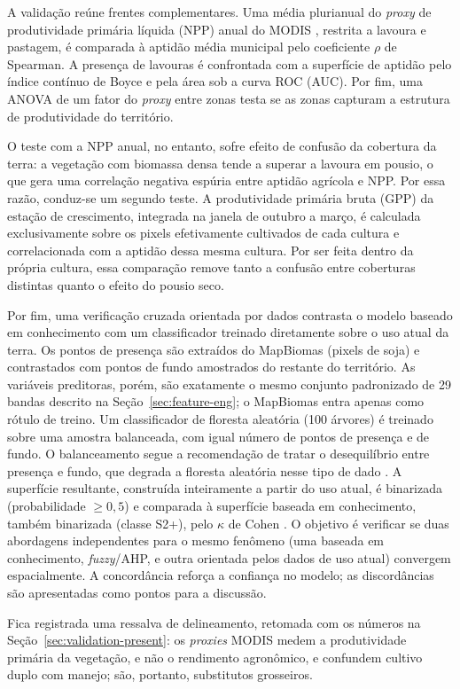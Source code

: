 A validação reúne frentes complementares. Uma média plurianual do \emph{proxy} de produtividade
primária líquida (NPP) anual do MODIS \citep{zhao_improvements_2005}, restrita a lavoura e pastagem, é
comparada à aptidão média municipal pelo coeficiente $\rho$ de Spearman. A presença de lavouras é
confrontada com a superfície de aptidão pelo índice contínuo de Boyce \citep{hirzel_evaluating_2006} e
pela área sob a curva ROC (AUC). Por fim, uma ANOVA de um fator do \emph{proxy} entre zonas testa se
as zonas capturam a estrutura de produtividade do território.

O teste com a NPP anual, no entanto, sofre efeito de confusão da cobertura da terra: a vegetação com
biomassa densa tende a superar a lavoura em pousio, o que gera uma correlação negativa espúria entre
aptidão agrícola e NPP. Por essa razão, conduz-se um segundo teste. A produtividade primária bruta
(GPP) da estação de crescimento, integrada na janela de outubro a março, é calculada exclusivamente
sobre os pixels efetivamente cultivados de cada cultura e correlacionada com a aptidão dessa mesma
cultura. Por ser feita dentro da própria cultura, essa comparação remove tanto a confusão entre
coberturas distintas quanto o efeito do pousio seco.

Por fim, uma verificação cruzada orientada por dados contrasta o modelo baseado em conhecimento
com um classificador treinado diretamente sobre o uso atual da terra. Os pontos de presença
são extraídos do MapBiomas (pixels de soja) e contrastados com pontos de fundo amostrados do
restante do território. As variáveis preditoras, porém, são exatamente o mesmo conjunto
padronizado de 29 bandas descrito na Seção~\ref{sec:feature-eng}; o MapBiomas entra apenas como
rótulo de treino. Um classificador de floresta aleatória (100 árvores) é treinado sobre uma amostra
balanceada, com igual número de pontos de presença e de fundo. O balanceamento segue a recomendação de
tratar o desequilíbrio entre presença e fundo, que degrada a floresta aleatória nesse
tipo de dado \citep{valavi_modelling_2021}. A superfície resultante, construída inteiramente a
partir do uso atual, é binarizada (probabilidade $\geq 0{,}5$) e comparada à superfície baseada
em conhecimento, também binarizada (classe S2+), pelo $\kappa$ de Cohen
\citep[p.~40, eq.~1]{cohen_coefficient_1960}. O objetivo é verificar se duas abordagens independentes
para o mesmo fenômeno (uma baseada em conhecimento, \emph{fuzzy}/AHP, e outra orientada pelos dados de
uso atual) convergem espacialmente. A concordância reforça a confiança no modelo; as discordâncias são
apresentadas como pontos para a discussão.

Fica registrada uma ressalva de delineamento, retomada com os números na
Seção~\ref{sec:validation-present}: os \emph{proxies} MODIS medem a produtividade primária da
vegetação, e não o rendimento agronômico, e confundem cultivo duplo com manejo; são, portanto,
substitutos grosseiros.
